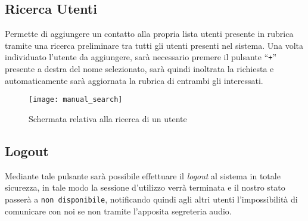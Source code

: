 \clearpage
\subsection{Ricerca Utenti}
Permette di aggiungere un contatto alla propria lista utenti presente in rubrica tramite una ricerca preliminare tra tutti gli utenti presenti nel sistema. Una volta individuato l'utente da aggiungere, sarà necessario premere il pulsante ``\texttt{+}'' presente a destra del nome selezionato, sarà quindi inoltrata la richiesta e automaticamente sarà aggiornata la rubrica di entrambi gli interessati.

\begin{figure}[H]
  \centering
  \texttt{[image: manual\_search]}
\caption{Schermata relativa alla ricerca di un utente}\label{fig:manual_search}
\end{figure}

\subsection{Logout}

Mediante tale pulsante sarà possibile effettuare il \textit{logout} al sistema in totale sicurezza, in tale modo la sessione d'utilizzo verrà terminata e il nostro stato passerà a \texttt{non disponibile}, notificando quindi agli altri utenti l'impossibilità di comunicare con noi se non tramite l'apposita segreteria audio.

\clearpage



